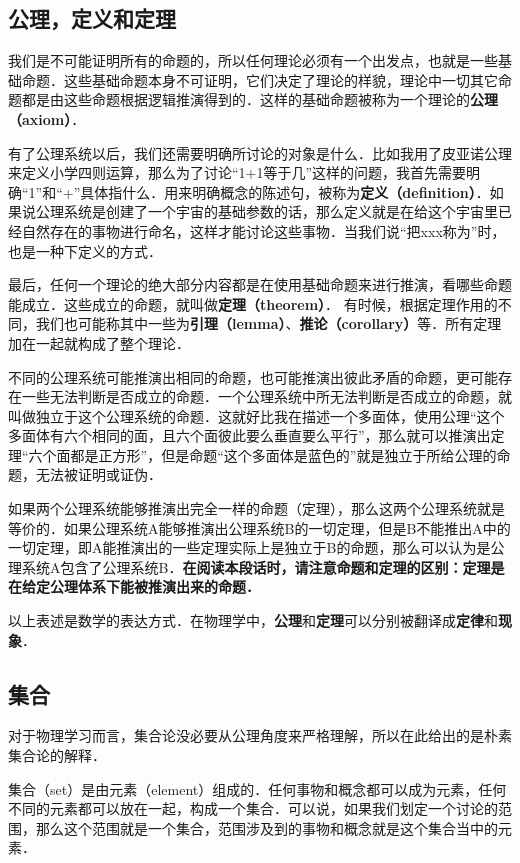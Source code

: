 \subsection{公理，定义和定理}
我们是不可能证明所有的命题的，所以任何理论必须有一个出发点，也就是一些基础命题．这些基础命题本身不可证明，它们决定了理论的样貌，理论中一切其它命题都是由这些命题根据逻辑推演得到的．这样的基础命题被称为一个理论的\textbf{公理（axiom）}．

有了公理系统以后，我们还需要明确所讨论的对象是什么．比如我用了皮亚诺公理来定义小学四则运算，那么为了讨论“1+1等于几”这样的问题，我首先需要明确“1”和“+”具体指什么．用来明确概念的陈述句，被称为\textbf{定义（definition）}．如果说公理系统是创建了一个宇宙的基础参数的话，那么定义就是在给这个宇宙里已经自然存在的事物进行命名，这样才能讨论这些事物．当我们说“把xxx称为”时，也是一种下定义的方式．

最后，任何一个理论的绝大部分内容都是在使用基础命题来进行推演，看哪些命题能成立．这些成立的命题，就叫做\textbf{定理（theorem）}． 有时候，根据定理作用的不同，我们也可能称其中一些为\textbf{引理（lemma）}、\textbf{推论（corollary）}等．所有定理加在一起就构成了整个理论．

不同的公理系统可能推演出相同的命题，也可能推演出彼此矛盾的命题，更可能存在一些无法判断是否成立的命题．一个公理系统中所无法判断是否成立的命题，就叫做独立于这个公理系统的命题．这就好比我在描述一个多面体，使用公理“这个多面体有六个相同的面，且六个面彼此要么垂直要么平行”，那么就可以推演出定理“六个面都是正方形”，但是命题“这个多面体是蓝色的”就是独立于所给公理的命题，无法被证明或证伪．

如果两个公理系统能够推演出完全一样的命题（定理），那么这两个公理系统就是等价的．如果公理系统A能够推演出公理系统B的一切定理，但是B不能推出A中的一切定理，即A能推演出的一些定理实际上是独立于B的命题，那么可以认为是公理系统A包含了公理系统B．\textbf{在阅读本段话时，请注意命题和定理的区别：定理是在给定公理体系下能被推演出来的命题．}

以上表述是数学的表达方式．在物理学中，\textbf{公理}和\textbf{定理}可以分别被翻译成\textbf{定律}和\textbf{现象}． 

\subsection{集合}

对于物理学习而言，集合论没必要从公理角度来严格理解，所以在此给出的是朴素集合论的解释．

集合（set）是由元素（element）组成的．任何事物和概念都可以成为元素，任何不同的元素都可以放在一起，构成一个集合．可以说，如果我们划定一个讨论的范围，那么这个范围就是一个集合，范围涉及到的事物和概念就是这个集合当中的元素．

